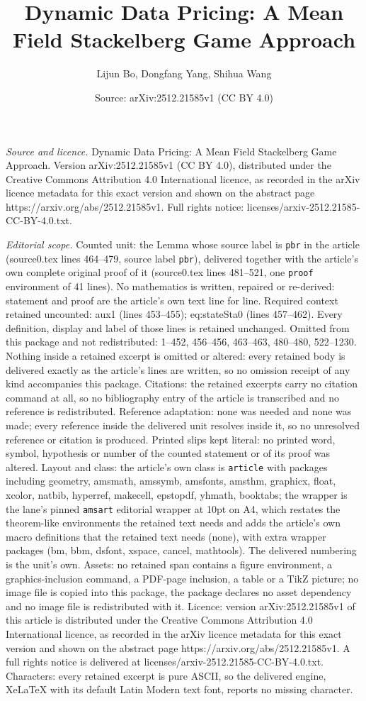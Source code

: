 \documentclass[10pt,a4paper]{amsart}
\title[Dynamic Data Pricing: A Mean Field Stackelberg Game Approach]{Dynamic Data Pricing: A Mean Field Stackelberg Game Approach}
\author{Lijun Bo, Dongfang Yang, Shihua Wang}
\date{Source: arXiv:2512.21585v1 (CC BY 4.0)}
\begin{document}
\maketitle

\noindent\emph{Source and licence.} Dynamic Data Pricing: A Mean Field Stackelberg Game Approach. Version arXiv:2512.21585v1 (CC BY 4.0), distributed under the Creative Commons Attribution 4.0 International licence, as recorded in the arXiv licence metadata for this exact version and shown on the abstract page https://arxiv.org/abs/2512.21585v1. Full rights notice: licenses/arxiv-2512.21585-CC-BY-4.0.txt.\par\smallskip

\noindent\textit{Editorial scope.} Counted unit: the Lemma whose source label is \texttt{pbr} in the article (source0.tex lines 464--479, source label \texttt{pbr}), delivered together with the article's own complete original proof of it (source0.tex lines 481--521, one \texttt{proof} environment of 41 lines). No mathematics is written, repaired or re-derived: statement and proof are the article's own text line for line. Required context retained uncounted: aux1 (lines 453--455); eq:stateSta0 (lines 457--462). Every definition, display and label of those lines is retained unchanged. Omitted from this package and not redistributed: 1--452, 456--456, 463--463, 480--480, 522--1230. Nothing inside a retained excerpt is omitted or altered: every retained body is delivered exactly as the article's lines are written, so no omission receipt of any kind accompanies this package. Citations: the retained excerpts carry no citation command at all, so no bibliography entry of the article is transcribed and no reference is redistributed. Reference adaptation: none was needed and none was made; every reference inside the delivered unit resolves inside it, so no unresolved reference or citation is produced. Printed slips kept literal: no printed word, symbol, hypothesis or number of the counted statement or of its proof was altered. Layout and class: the article's own class is \texttt{article} with packages including geometry, amsmath, amssymb, amsfonts, amsthm, graphicx, float, xcolor, natbib, hyperref, makecell, epstopdf, yhmath, booktabs; the wrapper is the lane's pinned \texttt{amsart} editorial wrapper at 10pt on A4, which restates the theorem-like environments the retained text needs and adds the article's own macro definitions that the retained text needs (none), with extra wrapper packages (bm, bbm, dsfont, xspace, cancel, mathtools). The delivered numbering is the unit's own. Assets: no retained span contains a figure environment, a graphics-inclusion command, a PDF-page inclusion, a table or a TikZ picture; no image file is copied into this package, the package declares no asset dependency and no image file is redistributed with it. Licence: version arXiv:2512.21585v1 of this article is distributed under the Creative Commons Attribution 4.0 International licence, as recorded in the arXiv licence metadata for this exact version and shown on the abstract page https://arxiv.org/abs/2512.21585v1. A full rights notice is delivered at licenses/arxiv-2512.21585-CC-BY-4.0.txt. Characters: every retained excerpt is pure ASCII, so the delivered engine, XeLaTeX with its default Latin Modern text font, reports no missing character.
\end{document}

